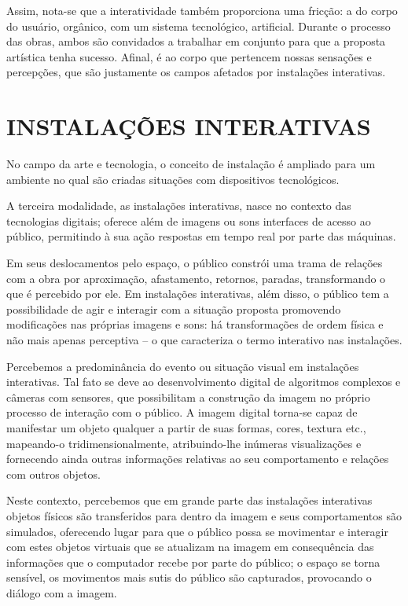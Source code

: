 Assim, nota-se que a interatividade também proporciona uma fricção: a do corpo do usuário, orgânico, com um sistema tecnológico, artificial. Durante o processo das obras, ambos são convidados a trabalhar em conjunto para que a proposta artística tenha sucesso. Afinal, é ao corpo que pertencem nossas sensações e percepções, que são justamente os campos afetados por instalações interativas. \cite{witt}



\section{INSTALAÇÕES INTERATIVAS}

No campo da arte e tecnologia, o conceito de instalação é ampliado para um ambiente no qual são criadas situações com dispositivos tecnológicos. \cite[p. 5]{bochio}

A terceira modalidade, as instalações interativas, nasce no contexto das tecnologias digitais; oferece além de imagens ou sons interfaces de acesso ao público, permitindo à sua ação respostas em tempo real por parte das máquinas. \cite[p. 6]{bochio}

Em seus deslocamentos pelo espaço, o público constrói uma trama de relações com a obra por aproximação, afastamento, retornos, paradas, transformando o que é percebido por ele. Em instalações interativas, além disso, o público tem a possibilidade de agir e interagir com a situação proposta promovendo modificações nas próprias imagens e sons:  há transformações de ordem física e não mais apenas perceptiva – o que caracteriza o termo interativo nas instalações.  \cite[p. 6]{bochio}

Percebemos a predominância do evento ou situação visual em instalações interativas. Tal fato se deve ao desenvolvimento digital de algoritmos complexos e câmeras com sensores, que possibilitam a construção da imagem no próprio processo de interação com o público. A imagem digital torna-se capaz de manifestar um objeto qualquer a partir de suas formas, cores, textura etc., mapeando-o tridimensionalmente, atribuindo-lhe inúmeras visualizações e fornecendo ainda outras informações relativas ao seu comportamento e relações com outros objetos. \cite[p. 6]{bochio}

Neste contexto, percebemos que em grande parte das instalações interativas objetos físicos são transferidos para dentro da imagem e seus comportamentos são simulados, oferecendo lugar para que o público possa se movimentar e interagir com estes objetos virtuais que se atualizam na imagem em consequência das informações que o computador recebe por parte do público; o espaço se torna sensível, os movimentos mais sutis do público são capturados, provocando o diálogo com a imagem. \cite[p. 6]{bochio}

